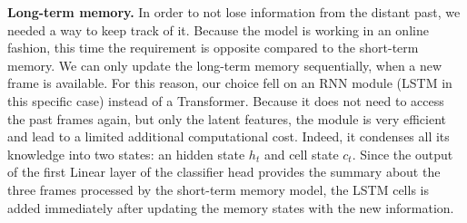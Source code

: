 \noindent\textbf{Long-term memory.}
In order to not lose information from the distant past, we needed a way to keep track of it.
Because the model is working in an online fashion, this time the requirement is opposite compared to the short-term memory.
We can only update the long-term memory sequentially, when a new frame is available.
For this reason, our choice fell on an RNN module (LSTM in this specific case) instead of a Transformer.
Because it does not need to access the past frames again, but only the latent features, the module is very efficient and lead to a limited additional computational cost.
Indeed, it condenses all its knowledge into two states: an hidden state $h_t$ and cell state $c_t$.
Since the output of the first Linear layer of the classifier head provides the summary about the three frames processed by the short-term memory model, the LSTM cells is added immediately after updating the memory states with the new information.

